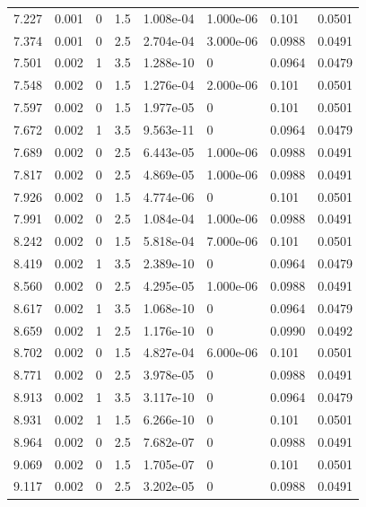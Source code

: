 \documentclass[preview]{standalone}
\begin{document}
{{{\begin{tabular}{L{1.2cm}C{1.2cm} C{0.3cm}C{0.5cm} C{1.4cm}C{1.4cm} C{1.4cm}C{1.4cm}}
  7.227  &  0.001  & 0     & 1.5 &  1.008e-04  & 1.000e-06  & 0.101 &  0.0501   \\ 
  7.374  &  0.001  & 0     & 2.5 &  2.704e-04  & 3.000e-06  & 0.0988 &  0.0491   \\ 
  7.501  &  0.002  & 1     & 3.5 &  1.288e-10  & 0  & 0.0964 &  0.0479   \\ 
  7.548  &  0.002  & 0     & 1.5 &  1.276e-04  & 2.000e-06  & 0.101 &  0.0501   \\ 
  7.597  &  0.002  & 0     & 1.5 &  1.977e-05  & 0  & 0.101 &  0.0501   \\ 
  7.672  &  0.002  & 1     & 3.5 &  9.563e-11  & 0  & 0.0964 &  0.0479   \\ 
  7.689  &  0.002  & 0     & 2.5 &  6.443e-05  & 1.000e-06  & 0.0988 &  0.0491   \\ 
  7.817  &  0.002  & 0     & 2.5 &  4.869e-05  & 1.000e-06  & 0.0988 &  0.0491   \\ 
  7.926  &  0.002  & 0     & 1.5 &  4.774e-06  & 0  & 0.101 &  0.0501   \\ 
  7.991  &  0.002  & 0     & 2.5 &  1.084e-04  & 1.000e-06  & 0.0988 &  0.0491   \\ 
  8.242  &  0.002  & 0     & 1.5 &  5.818e-04  & 7.000e-06  & 0.101 &  0.0501   \\ 
  8.419  &  0.002  & 1     & 3.5 &  2.389e-10  & 0  & 0.0964 &  0.0479   \\ 
  8.560  &  0.002  & 0     & 2.5 &  4.295e-05  & 1.000e-06  & 0.0988 &  0.0491   \\ 
  8.617  &  0.002  & 1     & 3.5 &  1.068e-10  & 0  & 0.0964 &  0.0479   \\ 
  8.659  &  0.002  & 1     & 2.5 &  1.176e-10  & 0  & 0.0990 &  0.0492   \\ 
  8.702  &  0.002  & 0     & 1.5 &  4.827e-04  & 6.000e-06  & 0.101 &  0.0501   \\ 
  8.771  &  0.002  & 0     & 2.5 &  3.978e-05  & 0  & 0.0988 &  0.0491   \\ 
  8.913  &  0.002  & 1     & 3.5 &  3.117e-10  & 0  & 0.0964 &  0.0479   \\ 
  8.931  &  0.002  & 1     & 1.5 &  6.266e-10  & 0  & 0.101 &  0.0501   \\ 
  8.964  &  0.002  & 0     & 2.5 &  7.682e-07  & 0  & 0.0988 &  0.0491   \\ 
  9.069  &  0.002  & 0     & 1.5 &  1.705e-07  & 0  & 0.101 &  0.0501   \\ 
  9.117  &  0.002  & 0     & 2.5 &  3.202e-05  & 0  & 0.0988 &  0.0491   \\ 

\end{tabular}}}}
\end{document}
